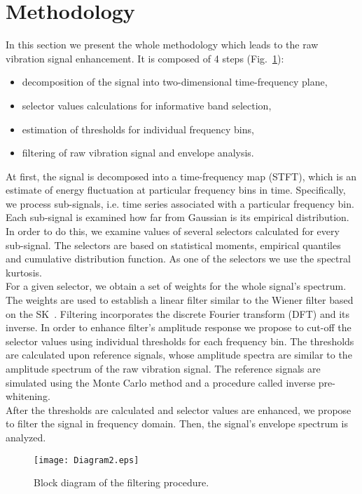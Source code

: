 \documentclass[11pt]{article} %
\begin{document}
\section{Methodology}\label{methodology}
In this section we present the whole methodology which leads to the raw vibration signal enhancement. It is composed of 4 steps (Fig.~\ref{diagram}):
\begin{itemize}
\item{decomposition of the signal into two-dimensional time-frequency plane,}
\item{selector values calculations for informative band selection,}
\item{estimation of thresholds for individual frequency bins,}
\item{filtering of raw vibration signal and envelope analysis.}
\end{itemize}
At first, the signal is decomposed into a time-frequency map (STFT), which is an estimate of energy fluctuation at particular frequency bins in time. Specifically, we process sub-signals, i.e. time series associated with a particular frequency bin. Each sub-signal is examined how far from Gaussian is its empirical distribution. In order to do this, we examine values of several selectors calculated for every sub-signal. The selectors are based on statistical moments, empirical quantiles and cumulative distribution function. As one of the selectors we use the spectral kurtosis.\\
For a given selector, we obtain a set of weights for the whole signal's spectrum. The weights are used to establish a linear filter similar to the Wiener filter based on the SK~\cite{CombetSK}. Filtering incorporates the discrete Fourier transform (DFT) and its inverse. In order to enhance filter's amplitude response we propose to cut-off the selector values using individual thresholds for each frequency bin. The thresholds are calculated upon reference signals, whose amplitude spectra are similar to the amplitude spectrum of the raw vibration signal. The reference signals are simulated using the Monte Carlo method and a procedure called inverse pre-whitening.\\
After the thresholds are calculated and selector values are enhanced, we propose to filter the signal in frequency domain. Then, the signal's envelope spectrum is analyzed.
\begin{figure}[!t]
\centering
\texttt{[image: Diagram2.eps]}
\caption{Block diagram of the filtering procedure.}
\label{diagram}
\end{figure}
\end{document}
